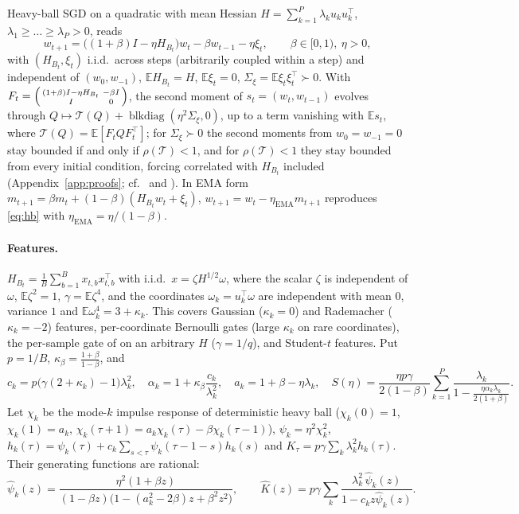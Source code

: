 \documentclass[11pt]{article}
\newcommand{\E}{\mathbb{E}}
\newcommand{\T}{\mathcal T}
\begin{document}
Heavy-ball SGD on a quadratic with mean Hessian $H=\sum_{k=1}^P\lambda_ku_ku_k^\top$, $\lambda_1\ge\dots\ge\lambda_P>0$, reads
\begin{equation}\label{eq:hb}
w_{t+1}=\big((1+\beta)I-\eta H_{B_t}\big)w_t-\beta w_{t-1}-\eta\xi_t,\qquad \beta\in[0,1),\ \eta>0,
\end{equation}
with $(H_{B_t},\xi_t)$ i.i.d.\ across steps (arbitrarily coupled within a step) and independent of $(w_0,w_{-1})$, $\E H_{B_t}=H$, $\E\xi_t=0$, $\Sigma_\xi=\E\xi_t\xi_t^\top\succ0$. With $F_t=\begin{psmallmatrix}(1+\beta)I-\eta H_{B_t}&-\beta I\\ I&0\end{psmallmatrix}$, the second moment of $s_t=(w_t,w_{t-1})$ evolves through $Q\mapsto\T(Q)+\operatorname{blkdiag}(\eta^2\Sigma_\xi,0)$, up to a term vanishing with $\E s_t$, where $\T(Q)=\E[F_tQF_t^\top]$; for $\Sigma_\xi\succ0$ the second moments from $w_0=w_{-1}=0$ stay bounded if and only if $\rho(\T)<1$, and for $\rho(\T)<1$ they stay bounded from every initial condition, forcing correlated with $H_{B_t}$ included (Appendix~\ref{app:proofs}; cf.\ \citealp[Ch.~3]{costa2005mjls} and \citealp[Proposition~C.3]{cai2026llm}). In EMA form $m_{t+1}=\beta m_t+(1-\beta)(H_{B_t}w_t+\xi_t)$, $w_{t+1}=w_t-\eta_{\mathrm{EMA}}m_{t+1}$ reproduces \eqref{eq:hb} with $\eta_{\mathrm{EMA}}=\eta/(1-\beta)$.

\paragraph{Features.} $H_{B_t}=\frac1B\sum_{b=1}^Bx_{t,b}x_{t,b}^\top$ with i.i.d.\ $x=\zeta H^{1/2}\omega$, where the scalar $\zeta$ is independent of $\omega$, $\E\zeta^2=1$, $\gamma=\E\zeta^4$, and the coordinates $\omega_k=u_k^\top\omega$ are independent with mean $0$, variance $1$ and $\E\omega_k^4=3+\kappa_k$. This covers Gaussian ($\kappa_k=0$) and Rademacher ($\kappa_k=-2$) features, per-coordinate Bernoulli gates (large $\kappa_k$ on rare coordinates), the per-sample gate of \citet{everett2026sparse} on an arbitrary $H$ ($\gamma=1/q$), and Student-$t$ features. Put $p=1/B$, $\kappa_\beta=\frac{1+\beta}{1-\beta}$, and
\[
c_k=p\big(\gamma(2+\kappa_k)-1\big)\lambda_k^2,\quad \alpha_k=1+\kappa_\beta\frac{c_k}{\lambda_k^2},\quad a_k=1+\beta-\eta\lambda_k,\quad S(\eta)=\frac{\eta p\gamma}{2(1-\beta)}\sum_{k=1}^P\frac{\lambda_k}{1-\frac{\eta\alpha_k\lambda_k}{2(1+\beta)}} .
\]
Let $\chi_k$ be the mode-$k$ impulse response of deterministic heavy ball ($\chi_k(0)=1$, $\chi_k(1)=a_k$, $\chi_k(\tau+1)=a_k\chi_k(\tau)-\beta\chi_k(\tau-1)$), $\psi_k=\eta^2\chi_k^2$, $h_k(\tau)=\psi_k(\tau)+c_k\sum_{s<\tau}\psi_k(\tau-1-s)h_k(s)$ and $K_\tau=p\gamma\sum_k\lambda_k^2h_k(\tau)$. Their generating functions are rational:
\[
\widehat\psi_k(z)=\frac{\eta^2(1+\beta z)}{(1-\beta z)\big(1-(a_k^2-2\beta)z+\beta^2z^2\big)},\qquad \widehat K(z)=p\gamma\sum_k\frac{\lambda_k^2\,\widehat\psi_k(z)}{1-c_kz\widehat\psi_k(z)} .
\]
\end{document}
